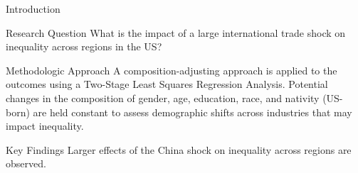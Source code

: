 \begin{frame}{Introduction}

    \begin{block}{Research Question}
        What is the impact of a large international trade shock on inequality across regions in the US?
    \end{block}

    \begin{block}{Methodologic Approach}
        A composition-adjusting approach is applied to the outcomes using a Two-Stage Least Squares Regression Analysis. Potential changes in the composition of gender, age, education, race, and nativity (US-born) are held constant to assess demographic shifts across industries that may impact inequality.
    \end{block}

    \begin{block}{Key Findings}
        Larger effects of the China shock on inequality across regions are observed.
    \end{block}

\end{frame}